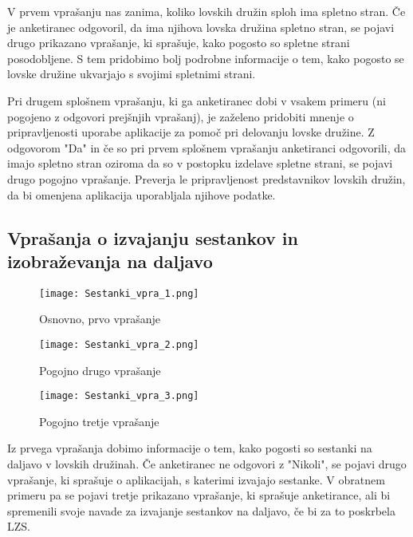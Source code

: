 \documentclass[a4paper,12pt,openright]{book}
\begin{document}
V prvem vprašanju nas zanima, koliko lovskih družin sploh ima spletno stran.
Če je anketiranec odgovoril, da ima njihova lovska družina spletno stran, se pojavi drugo prikazano vprašanje, ki sprašuje, kako pogosto so spletne strani posodobljene. 
S tem pridobimo bolj podrobne informacije o tem, kako pogosto se lovske družine ukvarjajo s svojimi spletnimi strani.



Pri drugem splošnem vprašanju, ki ga anketiranec dobi v vsakem primeru (ni pogojeno z odgovori prejšnjih vprašanj), je zaželeno pridobiti mnenje o pripravljenosti uporabe aplikacije za pomoč pri delovanju lovske družine.
Z odgovorom "Da" in če so pri prvem splošnem vprašanju anketiranci odgovorili, da imajo spletno stran oziroma da so v postopku izdelave spletne strani, se pojavi drugo pogojno vprašanje.
Preverja le pripravljenost predstavnikov lovskih družin, da bi omenjena aplikacija uporabljala njihove podatke.

\subsection{Vprašanja o izvajanju sestankov in izobraževanja na daljavo}

\begin{figure}[h!]
  \centering
  \begin{minipage}[b]{\textwidth}
    \centering
    \texttt{[image: Sestanki\_vpra\_1.png]}
    \caption{Osnovno, prvo vprašanje}
    \label{fig:sestanki_vpra_1}
  \end{minipage}
  
  \vspace{0.5cm} %
  
  \begin{minipage}[b]{0.6\textwidth}
    \centering
    \texttt{[image: Sestanki\_vpra\_2.png]}
    \caption{Pogojno drugo vprašanje}
    \label{fig:sestanki_vpra_2}
  \end{minipage}
\end{figure}


\begin{figure}[h!]
  \centering
  \texttt{[image: Sestanki\_vpra\_3.png]}
  \caption{Pogojno tretje vprašanje}
  \label{fig:sestanki_vpra_3}
\end{figure}

Iz prvega vprašanja dobimo informacije o tem, kako pogosti so sestanki na daljavo v lovskih družinah.
Če anketiranec ne odgovori z "Nikoli", se pojavi drugo vprašanje, ki sprašuje o aplikacijah, s katerimi izvajajo sestanke.
V obratnem primeru pa se pojavi tretje prikazano vprašanje, ki sprašuje anketirance, ali bi spremenili svoje navade za izvajanje sestankov na daljavo, če bi za to poskrbela LZS.
\end{document}
